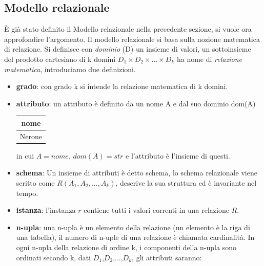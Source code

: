 \documentclass{article}
\begin{document}
    \subsection{Modello relazionale}
        È già stato definito il Modello relazionale nella precedente sezione, si vuole ora approfondire l'argomento.
        Il modello relazionale si basa sulla nozione matematica di relazione. Si definisce con \textit{dominio} (D) un insieme di valori, un sottoinsieme del prodotto cartesiano di k domini $D_1\times D_2 \times ...\times D_k$ ha nome di \textit{relazione matematica}, introduciamo due definizioni.
        
        \begin{itemize}
            \item \textbf{grado}:
                con grado k si intende la relazione matematica di k domini.

            \item \textbf{attributo}:
                un attributo è definito da un nome A e dal suo dominio dom(A)

                \begin{tabular}{|c|}
                    \hline
                    \textbf{nome}\\
                    \hline
                    Nerone\\
                    \hline

                \end{tabular}
                
                in cui $A=nome$, $dom(A)=str$ e l'attributo è l'insieme di questi.
            
            \item \textbf{schema}:
                Un insieme di attributi è detto schema, lo schema relazionale viene scritto come $R(A_1,A_2,...,A_k)$, descrive la sua struttura ed è invariante nel tempo.
            
            \item \textbf{istanza}:
                l'instanza $r$ contiene tutti i valori correnti in una relazione $R$. 

            \item \textbf{n-upla}:
                una n-upla è un elemento della relazione (un elemento è la riga di una tabella), il numero di n-uple di una relazione è chiamata cardinalità. In ogni n-upla della relazione di ordine k, i componenti della n-upla sono ordinati secondo k, dati $D_1$,$D_2$,...,$D_k$, gli attributi saranno:


\end{itemize}
\end{document}
